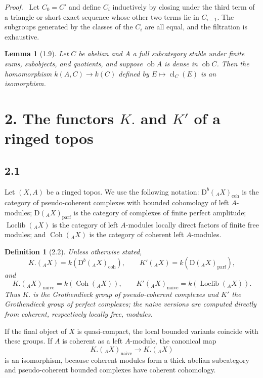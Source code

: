 \documentclass[13pt]{extarticle}
\newcommand{\D}{\mathrm D}
\newcommand{\Coh}{\operatorname{Coh}}
\newcommand{\Loclib}{\operatorname{Loclib}}
\newcommand{\ob}{\operatorname{ob}}
\newcommand{\cl}{\operatorname{cl}}
\newenvironment{prooftext}[1][Proof]{\par\noindent\emph{#1.}\ }{\par\medskip}
\newtheorem*{lemma*}{Lemma}
\newtheorem*{definition*}{Definition}
\begin{document}
\begin{prooftext}
Let $C_0=C'$ and define $C_i$ inductively by closing under the third term of a triangle or short exact sequence whose other two terms lie in $C_{i-1}$. The subgroups generated by the classes of the $C_i$ are all equal, and the filtration is exhaustive.
\end{prooftext}

\begin{lemma*}[1.9]
Let $C$ be abelian and $A$ a full subcategory stable under finite sums, subobjects, and quotients, and suppose $\ob A$ is dense in $\ob C$. Then the homomorphism $k(A,C)\to k(C)$ defined by $E\mapsto\cl_C(E)$ is an isomorphism.
\end{lemma*}

\section*{2. The functors $K.$ and $K'$ of a ringed topos}

\subsection*{2.1}
Let $(X,A)$ be a ringed topos. We use the following notation: $\D^b({}_AX)_{\mathrm{coh}}$ is the category of pseudo-coherent complexes with bounded cohomology of left $A$-modules; $\D({}_AX)_{\mathrm{parf}}$ is the category of complexes of finite perfect amplitude; $\Loclib({}_AX)$ is the category of left $A$-modules locally direct factors of finite free modules; and $\Coh({}_AX)$ is the category of coherent left $A$-modules.

\begin{definition*}[2.2]
Unless otherwise stated,
\[
K.({}_AX)=k(\D^b({}_AX)_{\mathrm{coh}}),\qquad
K'({}_AX)=k(\D({}_AX)_{\mathrm{parf}}),
\]
and
\[
K.({}_AX)_{\mathrm{naive}}=k(\Coh({}_AX)),\qquad
K'({}_AX)_{\mathrm{naive}}=k(\Loclib({}_AX)).
\]
Thus $K.$ is the Grothendieck group of pseudo-coherent complexes and $K'$ the Grothendieck group of perfect complexes; the naive versions are computed directly from coherent, respectively locally free, modules.
\end{definition*}

If the final object of $X$ is quasi-compact, the local bounded variants coincide with these groups. If $A$ is coherent as a left $A$-module, the canonical map
\[
K.({}_AX)_{\mathrm{naive}}\longrightarrow K.({}_AX)
\]
is an isomorphism, because coherent modules form a thick abelian subcategory and pseudo-coherent bounded complexes have coherent cohomology.
\end{document}
